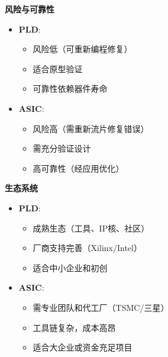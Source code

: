 \documentclass{beamer}
\providecommand{\tightlist}{%
  \setlength{\itemsep}{0pt}\setlength{\parskip}{0pt}}
\begin{document}
\begin{frame}{\textbf{风险与可靠性}}

\begin{itemize}
\tightlist
\item
    \textbf{PLD}:

    \begin{itemize}
    \tightlist
    \item
    风险低（可重新编程修复）\\
    \item
    适合原型验证\\
    \item
    可靠性依赖器件寿命\\
    \end{itemize}
\item
    \textbf{ASIC}:

    \begin{itemize}
    \tightlist
    \item
    风险高（需重新流片修复错误）\\
    \item
    需充分验证设计\\
    \item
    高可靠性（经应用优化）
    \end{itemize}
\end{itemize}
\end{frame}

\begin{frame}{\textbf{生态系统}}

\begin{itemize}
\tightlist
\item
    \textbf{PLD}:

    \begin{itemize}
    \tightlist
    \item
    成熟生态（工具、IP核、社区）\\
    \item
    厂商支持完善（Xilinx/Intel）\\
    \item
    适合中小企业和初创\\
    \end{itemize}
\item
    \textbf{ASIC}:

    \begin{itemize}
    \tightlist
    \item
    需专业团队和代工厂（TSMC/三星）\\
    \item
    工具链复杂，成本高昂\\
    \item
    适合大企业或资金充足项目
    \end{itemize}
\end{itemize}
\end{frame}
\end{document}
